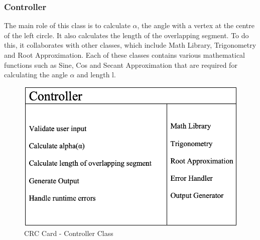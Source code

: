     \subsubsection{Controller}
      \parbox{1.0\linewidth}{
        The main role of this class is to calculate $\alpha$, the angle with a vertex at the centre of the left circle. It also calculates the length of the overlapping segment. To do this, it collaborates with other classes, which include Math Library, Trigonometry and Root Approximation. Each of these classes contains various mathematical functions such as Sine, Cos and Secant Approximation that are required for calculating the angle $\alpha$ and length l.
      }
      \vspace*{2em}
      \begin{figure}[h!]
        \centering
        \includegraphics[width=.5\linewidth]{resources/Controller.png}
        \caption{CRC Card - Controller Class}\label{fig:control}
      \end{figure}

